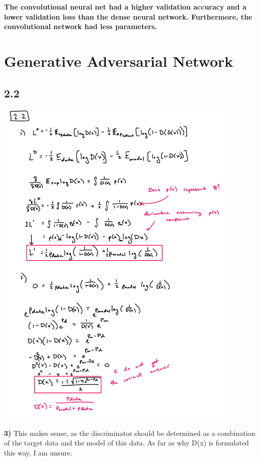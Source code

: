 \documentclass[a4paper,14pt]{extarticle}
\begin{document}
\textbf{The convolutional neural net had a higher validation accuracy and a lower validation loss than the dense neural network. Furthermore, the convolutional network had less parameters.}
\newpage
\section{Generative Adversarial Network}
\subsection*{2.2}
\begin{center}
    \includegraphics[width=450]{GAN_cs156Bonus_2.2.png}
\end{center}
\textbf{3)} This makes sense, as the discriminator should be determined as a combination of the target data and the model of this data. As far as why D(x) is formulated this way, I am unsure.
\end{document}
